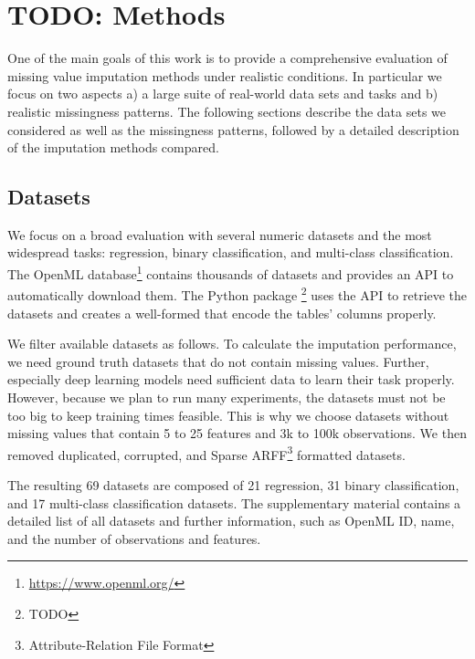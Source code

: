 
\section{TODO: Methods}
%
One of the main goals of this work is to provide a comprehensive evaluation of missing value imputation methods under realistic conditions. In particular we focus on two aspects a) a large suite of real-world data sets and tasks and b) realistic missingness patterns. The following sections describe the data sets we considered as well as the missingness patterns, followed by a detailed description of the imputation methods compared.

\subsection{Datasets}
%
We focus on a broad evaluation with several numeric datasets and the most widespread tasks: regression, binary classification, and multi-class classification. The OpenML database\footnote{\url{https://www.openml.org/}} contains thousands of datasets and provides an API to automatically download them. The Python package \footnote{TODO} uses the API to retrieve the datasets and creates a well-formed  that encode the tables' columns properly.

We filter available datasets as follows. To calculate the imputation performance, we need ground truth datasets that do not contain missing values. Further, especially deep learning models need sufficient data to learn their task properly. However, because we plan to run many experiments, the datasets must not be too big to keep training times feasible. This is why we choose datasets without missing values that contain 5 to 25 features and 3k to 100k observations. We then removed duplicated, corrupted, and Sparse ARFF\footnote{Attribute-Relation File Format} formatted datasets.

The resulting 69 datasets are composed of 21 regression, 31 binary classification, and 17 multi-class classification datasets. The supplementary material contains a detailed list of all datasets and further information, such as OpenML ID, name, and the number of observations and features.


